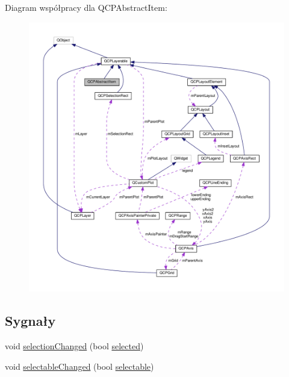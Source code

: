 Diagram współpracy dla Q\+C\+P\+Abstract\+Item\+:\nopagebreak
\begin{figure}[H]
\begin{center}
\leavevmode
\includegraphics[width=350pt]{class_q_c_p_abstract_item__coll__graph}
\end{center}
\end{figure}
\subsection*{Sygnały}
\begin{DoxyCompactItemize}
\item 
void \hyperlink{class_q_c_p_abstract_item_aa5cffb034fc65dbb91c77e02c1c14251}{selection\+Changed} (bool \hyperlink{class_q_c_p_abstract_item_a225865808640d8d9a7dd19f09a2e93f2}{selected})
\item 
void \hyperlink{class_q_c_p_abstract_item_a5b266c11aac61cb511901f3911dac2a3}{selectable\+Changed} (bool \hyperlink{class_q_c_p_abstract_item_a9189e752025533e1595eaade0009a3bc}{selectable})
\end{DoxyCompactItemize}
